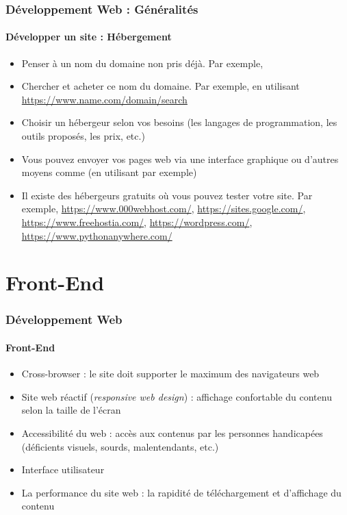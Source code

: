 \documentclass[xcolor=table]{beamer}
\begin{document}
\begin{frame}
\frametitle{Développement Web : Généralités}
\framesubtitle{Développer un site : Hébergement}

\begin{itemize}
	\item Penser à un nom du domaine non pris déjà. 
	Par exemple,  
	\item Chercher et acheter ce nom du domaine. Par exemple, en utilisant \url{https://www.name.com/domain/search} 
	\item Choisir un hébergeur selon vos besoins (les langages de programmation, les outils proposés, les prix, etc.)
	\item Vous pouvez envoyer vos pages web via une interface graphique ou d'autres moyens comme  (en utilisant  par exemple)
	\item Il existe des hébergeurs gratuits où vous pouvez tester votre site. 
	Par exemple, \url{https://www.000webhost.com/}, \url{https://sites.google.com/}, \url{https://www.freehostia.com/}, \url{https://wordpress.com/}, \url{https://www.pythonanywhere.com/}
\end{itemize}

\end{frame}

\section{Front-End}

\begin{frame}
\frametitle{Développement Web}
\framesubtitle{Front-End}

\begin{itemize}
	\item Cross-browser : le site doit supporter le maximum des navigateurs web
	\item Site web réactif (\textit{responsive web design}) : affichage confortable du contenu selon la taille de l'écran
	\item Accessibilité du web : accès aux contenus par les personnes handicapées (déficients visuels, sourds, malentendants, etc.) 
	\item Interface utilisateur
	\item La performance du site web : la rapidité de téléchargement et d'affichage du contenu
\end{itemize}

\end{frame}
\end{document}
